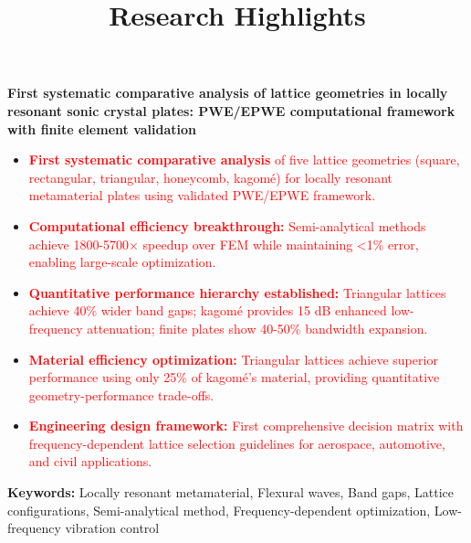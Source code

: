 \documentclass[11pt]{article}
\title{\textbf{Research Highlights}}
\author{}
\date{}
\begin{document}
\maketitle

\vspace{-1cm}

\textbf{First systematic comparative analysis of lattice geometries in locally resonant sonic crystal plates: PWE/EPWE computational framework with finite element validation}

\vspace{0.5cm}

\begin{itemize}[leftmargin=0.5cm, itemsep=0.3cm]

\item \textcolor{red}{\textbf{First systematic comparative analysis} of five lattice geometries (square, rectangular, triangular, honeycomb, kagomé) for locally resonant metamaterial plates using validated PWE/EPWE framework.}

\item \textcolor{red}{\textbf{Computational efficiency breakthrough:} Semi-analytical methods achieve 1800-5700× speedup over FEM while maintaining <1\% error, enabling large-scale optimization.}

\item \textcolor{red}{\textbf{Quantitative performance hierarchy established:} Triangular lattices achieve 40\% wider band gaps; kagomé provides 15 dB enhanced low-frequency attenuation; finite plates show 40-50\% bandwidth expansion.}

\item \textcolor{red}{\textbf{Material efficiency optimization:} Triangular lattices achieve superior performance using only 25\% of kagomé's material, providing quantitative geometry-performance trade-offs.}

\item \textcolor{red}{\textbf{Engineering design framework:} First comprehensive decision matrix with frequency-dependent lattice selection guidelines for aerospace, automotive, and civil applications.}

\end{itemize}

\vspace{0.5cm}

\textbf{Keywords:} Locally resonant metamaterial, Flexural waves, Band gaps, Lattice configurations, Semi-analytical method, Frequency-dependent optimization, Low-frequency vibration control
\end{document}

